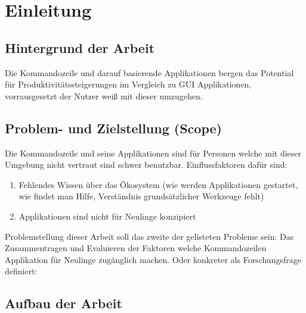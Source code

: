 \documentclass[oneside,bibliography=totocnumbered,BCOR=5mm]{scrbook}
\begin{document}
\chapter{Einleitung}
\section{Hintergrund der Arbeit}

Die Kommandozeile und darauf basierende Applikationen bergen das Potential für Produktivitätssteigerungen im Vergleich zu GUI Applikationen, vorrausgesetzt der Nutzer weiß mit dieser umzugehen. %


\section{Problem- und Zielstellung (Scope)}

Die Kommandozeile und seine Applikationen sind für Personen welche mit dieser Umgebung nicht vertraut sind schwer benutzbar. %
Einflussfaktoren dafür sind:

\begin{enumerate}
  \item Fehlendes Wissen über das Ökosystem (wie werden Applikationen gestartet, wie findet man Hilfe, Verständnis grundsätzlicher Werkzeuge fehlt)
  \item Applikationen sind nicht für Neulinge konzipiert
\end{enumerate}

Problemstellung dieser Arbeit soll das zweite der gelisteten Probleme sein: Das Zusammentragen und Evaluieren der Faktoren welche Kommandozeilen Applikation für Neulinge zugänglich machen. Oder konkreter als Forschungsfrage definiert:

\bigbreak


\section{Aufbau der Arbeit}
\end{document}
